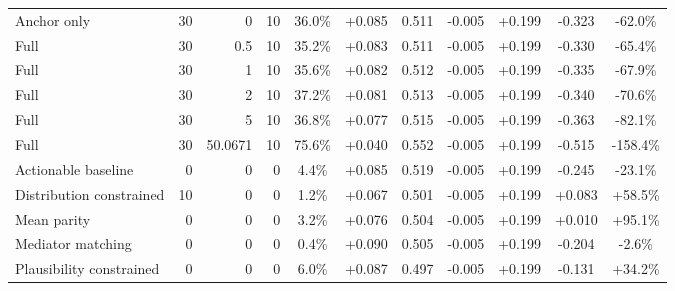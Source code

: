 \begin{table}[htbp]
\begin{tabular}{lrrrccccccc}
Anchor only & 30 & 0 & 10 & 36.0\% & +0.085 & 0.511 & -0.005 & +0.199 & -0.323 & -62.0\% \\
Full & 30 & 0.5 & 10 & 35.2\% & +0.083 & 0.511 & -0.005 & +0.199 & -0.330 & -65.4\% \\
Full & 30 & 1 & 10 & 35.6\% & +0.082 & 0.512 & -0.005 & +0.199 & -0.335 & -67.9\% \\
Full & 30 & 2 & 10 & 37.2\% & +0.081 & 0.513 & -0.005 & +0.199 & -0.340 & -70.6\% \\
Full & 30 & 5 & 10 & 36.8\% & +0.077 & 0.515 & -0.005 & +0.199 & -0.363 & -82.1\% \\
Full & 30 & 50.0671 & 10 & 75.6\% & +0.040 & 0.552 & -0.005 & +0.199 & -0.515 & -158.4\% \\
Actionable baseline & 0 & 0 & 0 & 4.4\% & +0.085 & 0.519 & -0.005 & +0.199 & -0.245 & -23.1\% \\
Distribution constrained & 10 & 0 & 0 & 1.2\% & +0.067 & 0.501 & -0.005 & +0.199 & +0.083 & +58.5\% \\
Mean parity & 0 & 0 & 0 & 3.2\% & +0.076 & 0.504 & -0.005 & +0.199 & +0.010 & +95.1\% \\
Mediator matching & 0 & 0 & 0 & 0.4\% & +0.090 & 0.505 & -0.005 & +0.199 & -0.204 & -2.6\% \\
Plausibility constrained & 0 & 0 & 0 & 6.0\% & +0.087 & 0.497 & -0.005 & +0.199 & -0.131 & +34.2\% \\
\bottomrule
\end{tabular}
\end{table}